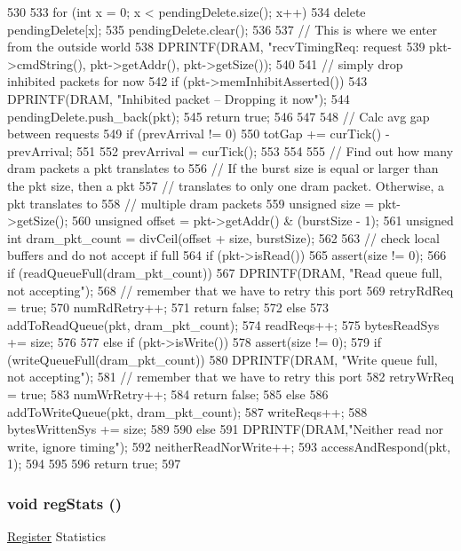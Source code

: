 \begin{DoxyCode}
530 {
533     for (int x = 0; x < pendingDelete.size(); x++)
534         delete pendingDelete[x];
535     pendingDelete.clear();
536 
537     // This is where we enter from the outside world
538     DPRINTF(DRAM, "recvTimingReq: request %
539             pkt->cmdString(), pkt->getAddr(), pkt->getSize());
540 
541     // simply drop inhibited packets for now
542     if (pkt->memInhibitAsserted()) {
543         DPRINTF(DRAM, "Inhibited packet -- Dropping it now\n");
544         pendingDelete.push_back(pkt);
545         return true;
546     }
547 
548     // Calc avg gap between requests
549     if (prevArrival != 0) {
550         totGap += curTick() - prevArrival;
551     }
552     prevArrival = curTick();
553 
554 
555     // Find out how many dram packets a pkt translates to
556     // If the burst size is equal or larger than the pkt size, then a pkt
557     // translates to only one dram packet. Otherwise, a pkt translates to
558     // multiple dram packets
559     unsigned size = pkt->getSize();
560     unsigned offset = pkt->getAddr() & (burstSize - 1);
561     unsigned int dram_pkt_count = divCeil(offset + size, burstSize);
562 
563     // check local buffers and do not accept if full
564     if (pkt->isRead()) {
565         assert(size != 0);
566         if (readQueueFull(dram_pkt_count)) {
567             DPRINTF(DRAM, "Read queue full, not accepting\n");
568             // remember that we have to retry this port
569             retryRdReq = true;
570             numRdRetry++;
571             return false;
572         } else {
573             addToReadQueue(pkt, dram_pkt_count);
574             readReqs++;
575             bytesReadSys += size;
576         }
577     } else if (pkt->isWrite()) {
578         assert(size != 0);
579         if (writeQueueFull(dram_pkt_count)) {
580             DPRINTF(DRAM, "Write queue full, not accepting\n");
581             // remember that we have to retry this port
582             retryWrReq = true;
583             numWrRetry++;
584             return false;
585         } else {
586             addToWriteQueue(pkt, dram_pkt_count);
587             writeReqs++;
588             bytesWrittenSys += size;
589         }
590     } else {
591         DPRINTF(DRAM,"Neither read nor write, ignore timing\n");
592         neitherReadNorWrite++;
593         accessAndRespond(pkt, 1);
594     }
595 
596     return true;
597 }
\end{DoxyCode}
\hypertarget{classDRAMCtrl_a4dc637449366fcdfc4e764cdf12d9b11}{
\subsubsection[{regStats}]{\setlength{\rightskip}{0pt plus 5cm}void regStats ()}}
\label{classDRAMCtrl_a4dc637449366fcdfc4e764cdf12d9b11}
\hyperlink{classRegister}{Register} Statistics 

